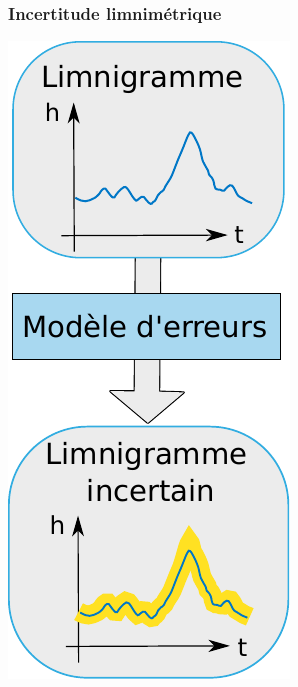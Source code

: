 \documentclass[compress,9pt]{beamer}
\begin{document}
	\begin{frame}
		\frametitle{Incertitude limnimétrique}
		\begin{minipage}{0.2\textwidth}
			\includegraphics[width = .9\textwidth]{./Figures/SchemLimni.pdf} 

\end{minipage}
\end{frame}
\end{document}
